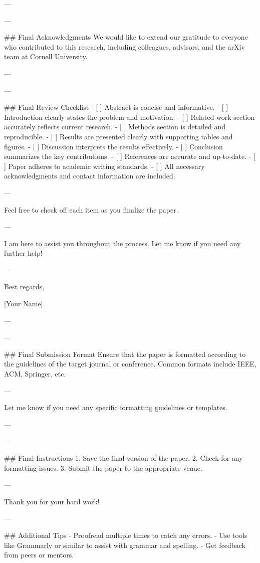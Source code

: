 --- 

---

## Final Acknowledgments
We would like to extend our gratitude to everyone who contributed to this research, including colleagues, advisors, and the arXiv team at Cornell University. 

--- 

---

## Final Review Checklist
- [ ] Abstract is concise and informative.
- [ ] Introduction clearly states the problem and motivation.
- [ ] Related work section accurately reflects current research.
- [ ] Methods section is detailed and reproducible.
- [ ] Results are presented clearly with supporting tables and figures.
- [ ] Discussion interprets the results effectively.
- [ ] Conclusion summarizes the key contributions.
- [ ] References are accurate and up-to-date.
- [ ] Paper adheres to academic writing standards.
- [ ] All necessary acknowledgments and contact information are included.

--- 

Feel free to check off each item as you finalize the paper. 

--- 

I am here to assist you throughout the process. Let me know if you need any further help! 

--- 

Best regards, 

[Your Name] 

--- 

---

## Final Submission Format
Ensure that the paper is formatted according to the guidelines of the target journal or conference. Common formats include IEEE, ACM, Springer, etc.

--- 

Let me know if you need any specific formatting guidelines or templates. 

--- 

---

## Final Instructions
1. Save the final version of the paper.
2. Check for any formatting issues.
3. Submit the paper to the appropriate venue.

--- 

Thank you for your hard work! 

--- 

## Additional Tips
- Proofread multiple times to catch any errors.
- Use tools like Grammarly or similar to assist with grammar and spelling.
- Get feedback from peers or mentors.

